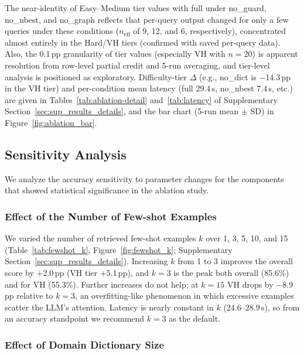 The near-identity of Easy--Medium tier values with full under no\_guard, no\_nbest, and no\_graph reflects that per-query output changed for only a few queries under these conditions ($n_\mathrm{eff}$ of 9, 12, and 6, respectively), concentrated almost entirely in the Hard/VH tiers (confirmed with saved per-query data). Also, the 0.1\,pp granularity of tier values (especially VH with $n=20$) is apparent resolution from row-level partial credit and 5-run averaging, and tier-level analysis is positioned as exploratory. Difficulty-tier $\Delta$ (e.g., no\_dict is $-$14.3\,pp in the VH tier) and per-condition mean latency (full 29.4\,s, no\_nbest 7.4\,s, etc.) are given in Tables~\ref{tab:ablation-detail} and~\ref{tab:latency} of Supplementary Section~\ref{sec:sup_results_details}, and the bar chart (5-run mean $\pm$ SD) in Figure~\ref{fig:ablation_bar}.


\subsection{Sensitivity Analysis}
\label{sec:sensitivity}

We analyze the accuracy sensitivity to parameter changes for the components that showed statistical significance in the ablation study.

\subsubsection{Effect of the Number of Few-shot Examples}
\label{sec:fewshot_sensitivity}

We varied the number of retrieved few-shot examples $k$ over 1, 3, 5, 10, and 15 (Table~\ref{tab:fewshot_k}, Figure~\ref{fig:fewshot_k}; Supplementary Section~\ref{sec:sup_results_details}). Increasing $k$ from 1 to 3 improves the overall score by $+$2.0\,pp (VH tier $+$5.1\,pp), and $k=3$ is the peak both overall (85.6\%) and for VH (55.3\%). Further increases do not help; at $k=15$ VH drops by $-$8.9\,pp relative to $k=3$, an overfitting-like phenomenon in which excessive examples scatter the LLM's attention. Latency is nearly constant in $k$ (24.6--28.9\,s), so from an accuracy standpoint we recommend $k=3$ as the default.

\subsubsection{Effect of Domain Dictionary Size}
\label{sec:dict_sensitivity}

